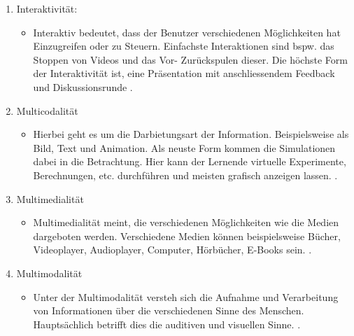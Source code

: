 \begin{enumerate}[leftmargin=*,label= \arabic*:]
	\item Interaktivität: 
	\begin{itemize}
		\item Interaktiv bedeutet, dass der Benutzer verschiedenen Möglichkeiten hat Einzugreifen oder zu Steuern. Einfachste Interaktionen sind bspw. das Stoppen von Videos und das Vor- Zurückspulen dieser. Die höchste Form der Interaktivität ist, eine Präsentation mit anschliessendem Feedback und Diskussionsrunde \cite[vgl.][]{elearning.interaktivitaet}. 
	\end{itemize}
	\item Multicodalität
		\begin{itemize}
		\item Hierbei geht es um die Darbietungsart der Information. Beispielsweise als Bild, Text und Animation. Als neuste Form kommen die Simulationen dabei in die Betrachtung. Hier kann der Lernende virtuelle Experimente, Berechnungen, etc. durchführen und meisten grafisch anzeigen lassen.  \cite[vgl.][]{elearning.multicodalitaet2}. 
	\end{itemize}
		\item Multimedialität
	\begin{itemize}
		\item Multimedialität meint, die verschiedenen Möglichkeiten wie die Medien dargeboten werden. Verschiedene Medien können beispielsweise Bücher, Videoplayer, Audioplayer, Computer, Hörbücher, E-Books sein.  \cite[vgl.][]{elearning.multimedialitaet2}. \newline  \newline
	\end{itemize}
		\item Multimodalität
	\begin{itemize}
		\item Unter der Multimodalität versteh sich die Aufnahme und Verarbeitung  von Informationen über die verschiedenen Sinne des Menschen. Hauptsächlich betrifft dies die auditiven und visuellen Sinne.  \cite[vgl.][]{elearning.multimodalitaet}. 
	\end{itemize}
\end{enumerate}

